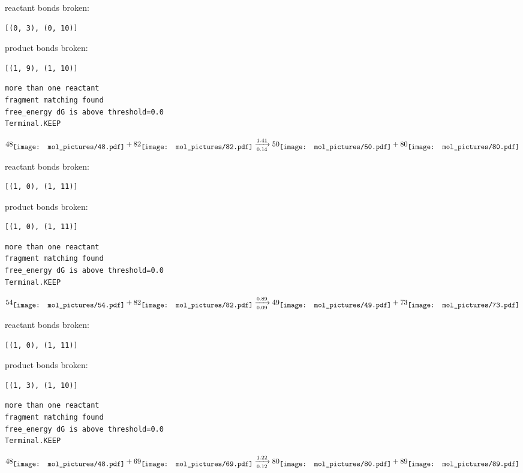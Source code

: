 \documentclass{article}
\begin{document}
reactant bonds broken:\begin{verbatim}
[(0, 3), (0, 10)]
\end{verbatim}
product bonds broken:\begin{verbatim}
[(1, 9), (1, 10)]
\end{verbatim}




\vspace{1cm}
\begin{verbatim}
more than one reactant
fragment matching found
free_energy dG is above threshold=0.0
Terminal.KEEP
\end{verbatim}
$$
48
\raisebox{-.5\height}{\texttt{[image: mol\_pictures/48.pdf]}}
+
82
\raisebox{-.5\height}{\texttt{[image: mol\_pictures/82.pdf]}}
\xrightarrow[0.14]{1.41}
50
\raisebox{-.5\height}{\texttt{[image: mol\_pictures/50.pdf]}}
+
80
\raisebox{-.5\height}{\texttt{[image: mol\_pictures/80.pdf]}}
$$


reactant bonds broken:\begin{verbatim}
[(1, 0), (1, 11)]
\end{verbatim}
product bonds broken:\begin{verbatim}
[(1, 0), (1, 11)]
\end{verbatim}




\vspace{1cm}
\begin{verbatim}
more than one reactant
fragment matching found
free_energy dG is above threshold=0.0
Terminal.KEEP
\end{verbatim}
$$
54
\raisebox{-.5\height}{\texttt{[image: mol\_pictures/54.pdf]}}
+
82
\raisebox{-.5\height}{\texttt{[image: mol\_pictures/82.pdf]}}
\xrightarrow[0.09]{0.89}
49
\raisebox{-.5\height}{\texttt{[image: mol\_pictures/49.pdf]}}
+
73
\raisebox{-.5\height}{\texttt{[image: mol\_pictures/73.pdf]}}
$$


reactant bonds broken:\begin{verbatim}
[(1, 0), (1, 11)]
\end{verbatim}
product bonds broken:\begin{verbatim}
[(1, 3), (1, 10)]
\end{verbatim}




\vspace{1cm}
\begin{verbatim}
more than one reactant
fragment matching found
free_energy dG is above threshold=0.0
Terminal.KEEP
\end{verbatim}
$$
48
\raisebox{-.5\height}{\texttt{[image: mol\_pictures/48.pdf]}}
+
69
\raisebox{-.5\height}{\texttt{[image: mol\_pictures/69.pdf]}}
\xrightarrow[0.12]{1.22}
80
\raisebox{-.5\height}{\texttt{[image: mol\_pictures/80.pdf]}}
+
89
\raisebox{-.5\height}{\texttt{[image: mol\_pictures/89.pdf]}}
$$
\end{document}
